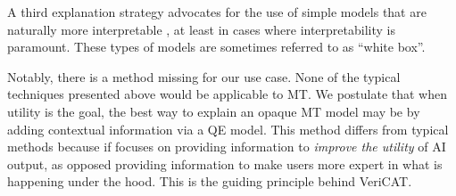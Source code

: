 A third explanation strategy advocates for the use of simple models that are naturally more interpretable \cite{rudin2018stop}, at least in cases where interpretability is paramount. These types of models are sometimes referred to as “white box”. %

Notably, there is a method missing for our use case. None of the typical techniques presented above would be applicable to MT. We postulate that when utility is the goal, the best way to explain an opaque MT model may be by adding contextual information via a QE model. This method differs from typical methods because if focuses on providing information to \textit{improve the utility} of AI output, as opposed providing information to make users more expert in what is happening under the hood. This is the guiding principle behind VeriCAT.   

